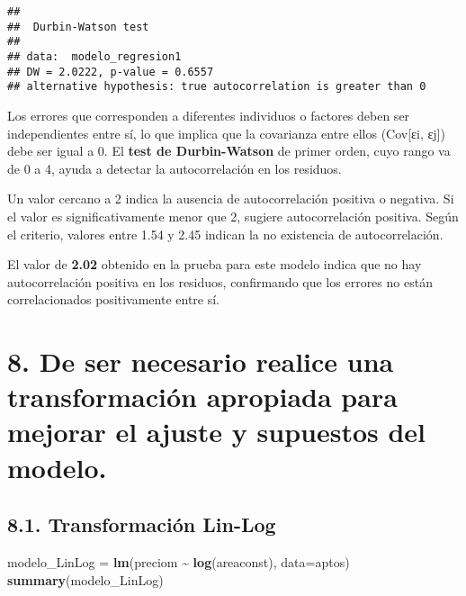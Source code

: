 \documentclass[
]{article}
\newenvironment{Shaded}{\begin{snugshade}}{\end{snugshade}}
\newcommand{\AttributeTok}[1]{\textcolor[rgb]{0.13,0.29,0.53}{#1}}
\newcommand{\FunctionTok}[1]{\textcolor[rgb]{0.13,0.29,0.53}{\textbf{#1}}}
\newcommand{\NormalTok}[1]{#1}
\newcommand{\OtherTok}[1]{\textcolor[rgb]{0.56,0.35,0.01}{#1}}
\newcommand{\SpecialCharTok}[1]{\textcolor[rgb]{0.81,0.36,0.00}{\textbf{#1}}}
\begin{document}
\begin{verbatim}
## 
##  Durbin-Watson test
## 
## data:  modelo_regresion1
## DW = 2.0222, p-value = 0.6557
## alternative hypothesis: true autocorrelation is greater than 0
\end{verbatim}

Los errores que corresponden a diferentes individuos o factores deben
ser independientes entre sí, lo que implica que la covarianza entre
ellos (Cov{[}εi, εj{]}) debe ser igual a 0. El \textbf{test de
Durbin-Watson} de primer orden, cuyo rango va de 0 a 4, ayuda a detectar
la autocorrelación en los residuos.

Un valor cercano a 2 indica la ausencia de autocorrelación positiva o
negativa. Si el valor es significativamente menor que 2, sugiere
autocorrelación positiva. Según el criterio, valores entre 1.54 y 2.45
indican la no existencia de autocorrelación.

El valor de \textbf{2.02} obtenido en la prueba para este modelo indica
que no hay autocorrelación positiva en los residuos, confirmando que los
errores no están correlacionados positivamente entre sí.

\section{\texorpdfstring{\textbf{8. De ser necesario realice una
transformación apropiada para mejorar el ajuste y supuestos del
modelo.}}{8. De ser necesario realice una transformación apropiada para mejorar el ajuste y supuestos del modelo.}}\label{de-ser-necesario-realice-una-transformaciuxf3n-apropiada-para-mejorar-el-ajuste-y-supuestos-del-modelo.}

\subsection{\texorpdfstring{\textbf{8.1. Transformación
Lin-Log}}{8.1. Transformación Lin-Log}}\label{transformaciuxf3n-lin-log}

\begin{Shaded}
\begin{Highlighting}[]
\NormalTok{modelo\_LinLog }\OtherTok{=} \FunctionTok{lm}\NormalTok{(preciom }\SpecialCharTok{\textasciitilde{}} \FunctionTok{log}\NormalTok{(areaconst), }\AttributeTok{data=}\NormalTok{aptos)      }
\FunctionTok{summary}\NormalTok{(modelo\_LinLog)}
\end{Highlighting}
\end{Shaded}
\end{document}
